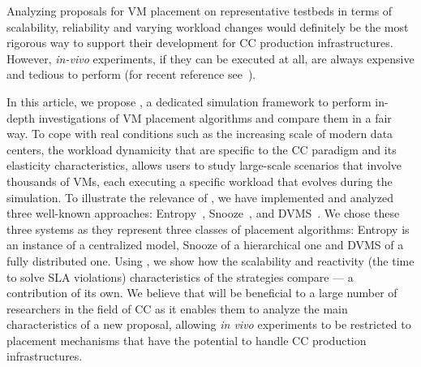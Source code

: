 Analyzing proposals for VM placement on representative testbeds in
terms of scalability, reliability and varying workload changes would
definitely be the most rigorous way to support their development for
CC production infrastructures.
However, \textit{in-vivo} experiments, if they can be
executed at all, are always expensive and tedious to perform (for
recent reference see~\cite{barker:pitfalls}).

In this article, we propose \vmps, a dedicated simulation framework to
perform in-depth investigations of VM placement algorithms and compare
them in a fair way. To cope with real conditions such as the
increasing scale of modern data centers, the workload dynamicity
that are specific to the CC paradigm and its elasticity
characteristics, \vmps allows users to study large-scale scenarios
that involve thousands of VMs,
each executing a specific workload that evolves during the
simulation.
%
%
To illustrate the relevance of \vmps, we have implemented and analyzed
three well-known approaches:
Entropy~\cite{Hermenier:2009:ECM:1508293.1508300},
Snooze~\cite{feller:ccgrid12}, and DVMS~\cite{quesnel:cpe2012}.
We chose these three systems as they represent three classes of
placement algorithms: Entropy is an instance of a centralized model,
Snooze of a hierarchical one and DVMS of a fully distributed one.
Using \vmps, we show how the scalability and reactivity (\ie the time
to solve SLA violations) characteristics of the strategies compare ---
a contribution of its own.
%
%
We believe that \vmps will be beneficial to a large number of
researchers in the field of CC as it enables them to analyze the main
characteristics of a new proposal, allowing \textit{in vivo}
experiments to be restricted to placement mechanisms that have the
potential to handle CC production infrastructures.

